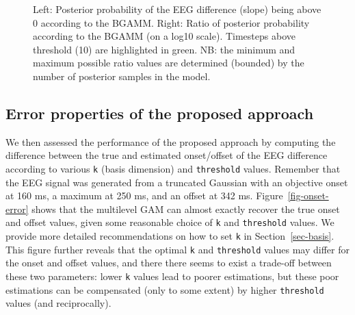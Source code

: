 \documentclass[
  doc,
  floatsintext,
  longtable,
  a4paper,
  nolmodern,
  notxfonts,
  notimes,
  donotrepeattitle,
  colorlinks=true,linkcolor=blue,citecolor=blue,urlcolor=blue]{apa7}
\begin{document}
\begin{figure}[!htb]

\caption{\label{fig-post-prob-ratio}Left: Posterior probability of the
EEG difference (slope) being above 0 according to the BGAMM. Right:
Ratio of posterior probability according to the BGAMM (on a log10
scale). Timesteps above threshold (10) are highlighted in green. NB: the
minimum and maximum possible ratio values are determined (bounded) by
the number of posterior samples in the model.}


\end{figure}%

\newpage

\subsection{Error properties of the proposed
approach}\label{error-properties-of-the-proposed-approach}

We then assessed the performance of the proposed approach by computing
the difference between the true and estimated onset/offset of the EEG
difference according to various \texttt{k} (basis dimension) and
\texttt{threshold} values. Remember that the EEG signal was generated
from a truncated Gaussian with an objective onset at 160 ms, a maximum
at 250 ms, and an offset at 342 ms. Figure~\ref{fig-onset-error} shows
that the multilevel GAM can almost exactly recover the true onset and
offset values, given some reasonable choice of \texttt{k} and
\texttt{threshold} values. We provide more detailed recommendations on
how to set \texttt{k} in Section~\ref{sec-basis}. This figure further
reveals that the optimal \texttt{k} and \texttt{threshold} values may
differ for the onset and offset values, and there there seems to exist a
trade-off between these two parameters: lower \texttt{k} values lead to
poorer estimations, but these poor estimations can be compensated (only
to some extent) by higher \texttt{threshold} values (and reciprocally).
\end{document}
